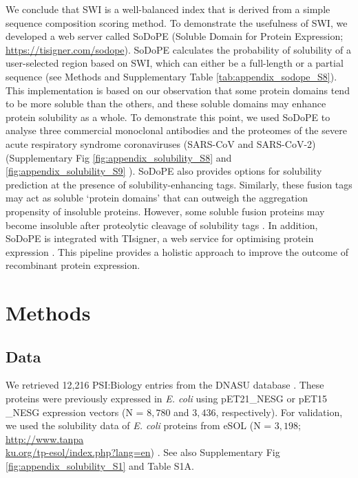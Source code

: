 We conclude that SWI is a well-balanced index that is derived from a simple sequence composition scoring method. To demonstrate the usefulness of SWI, we developed a web server called SoDoPE (Soluble Domain for Protein Expression; \href{https://tisigner.com/sodope}{https://tisigner.com/sodope}). SoDoPE calculates the probability of solubility of a user-selected region based on SWI, which can either be a full-length or a partial sequence (see Methods and Supplementary Table \ref{tab:appendix_sodope_S8}). This implementation is based on our observation that some protein domains tend to be more soluble than the others, and these soluble domains may enhance protein solubility as a whole. To demonstrate this point, we used SoDoPE to analyse three commercial monoclonal antibodies and the proteomes of the severe acute respiratory syndrome coronaviruses (SARS-CoV and SARS-CoV-2) \citep{Marra2003-zt,Wang2009-vj,Wu2020-oo} (Supplementary Fig \ref{fig:appendix_solubility_S8}  and \ref{fig:appendix_solubility_S9} ). SoDoPE also provides options for solubility prediction at the presence of solubility-enhancing tags. Similarly, these fusion tags may act as soluble ‘protein domains’ that can outweigh the aggregation propensity of insoluble proteins. However, some soluble fusion proteins may become insoluble after proteolytic cleavage of solubility tags \citep{Lebendiker2014-di}. In addition, SoDoPE is integrated with TIsigner, a web service for optimising protein expression \citep{bhandari2019highly}. This pipeline provides a holistic approach to improve the outcome of recombinant protein expression. \vspace*{-10pt}


\section{Methods}

\subsection{Data}
We retrieved 12,216 PSI:Biology entries from the DNASU database \citep{Chen2004-cp,Acton2005-ng,Seiler2014-on}. These proteins were previously expressed in {\it E. coli} using pET21\_NESG or pET15 \_NESG expression vectors (N = $8,780$ and $3,436$, respectively). For validation, we used the solubility data of {\it E. coli} proteins from eSOL (N = $3,198$; \href{http://www.tanpaku.org/tp-esol/index.php?lang=en}{http://www.tanpa\\ku.org/tp-esol/index.php?lang=en}) \citep{Niwa2009-ye}. See also Supplementary Fig \ref{fig:appendix_solubility_S1}  and Table S1A. 

